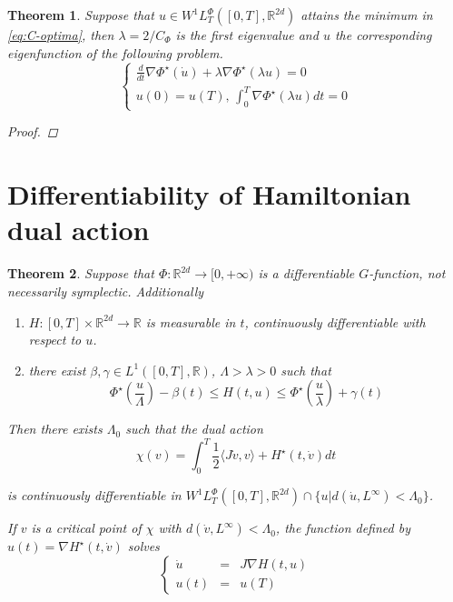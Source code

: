 \documentclass[twoside]{article}
\newtheorem{thm}{Theorem}[section]
\theoremstyle{remark}
\newcommand{\lphi}{L^{\Phi}}
\newcommand{\wphit}{W^{1}\lphi_T}
\newcommand{\rr}{\mathbb{R}}
\renewcommand{\leq}{\leqslant}
\newcommand{\Phie}{\Phi^{\star}}
\begin{document}
\begin{thm}\label{thm:C-opt-hamil} Suppose that $u\in \wphit([0,T],\rr^{2d})$ attains the minimum in \eqref{eq:C-optima}, then $\lambda=2/C_{\Phi}$ is the first eigenvalue and $u$ the corresponding eigenfunction of the following problem.
\begin{equation}\label{eq:eigen_prob}
\left\{
\begin{array}{l}
 \frac{d}{dt}\nabla\Phie(\dot{u})+\lambda\nabla\Phie(\lambda u)=0\\
 u(0)=u(T), \, \int_0^T\nabla\Phie (\lambda u)dt=0
\end{array}
\right.\tag{Eig}
\end{equation}
\begin{proof} 
 
\end{proof}






 
\end{thm}









\section{Differentiability of Hamiltonian dual action}

\begin{thm}\label{thm:DiffDualAct}
Suppose that $\Phi:\rr^{2d}\to [0,+\infty)$ is a differentiable $G$-function, not necessarily symplectic. Additionally
\begin{enumerate}
\item \label{it:h1-prop-H}
$H:[0,T]\times\rr^{2d}\to \rr$ is measurable in $t$, continuously differentiable with respect to $u$.
\item \label{it:h2-cotaH-conjphi}there exist $\beta, \gamma \in L^1([0,T],\rr)$, $\Lambda>\lambda>0$ such that
\begin{equation}\label{eq:cota-H-phi-conj}
\Phi^{\star}\left(\frac{u}{\Lambda}\right)-\beta(t)\leq H(t,u) \leq \Phi^{\star}\left(\frac{u}{\lambda}\right)+\gamma(t)
\end{equation}
\end{enumerate}
Then there exists $\Lambda_0$ such that the dual action
\begin{equation}\label{eq:DualAct}
 \chi(v)=\int_0^T \frac{1}{2} \langle J\dot{v},v\rangle+H^{\star}(t,\dot{v})  dt
\end{equation}



is continuously differentiable in $\wphit([0,T],\rr^{2d}) \cap \{u|d(\dot{u},L^{\infty})<\Lambda_0\}$.

If $v$ is a critical point of $\chi$ with $d(\dot{v},L^{\infty})<\Lambda_0$, the function defined by 
$u(t)=\nabla  H^{\star}(t,\dot{v})$
solves 
\[
\left\{\begin{array} {lll}
\dot{u}&=&J\nabla H (t,u)
\\
u(t)&=&u(T)
\end{array}
\right.
\]
\end{thm}
\end{document}

